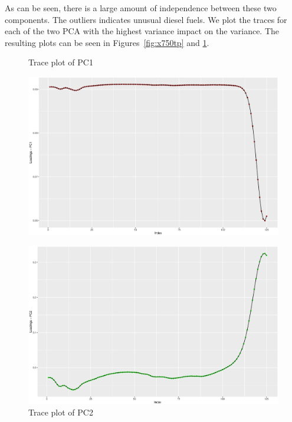 \documentclass[a4paper,12pt]{article}
\begin{document}
    As can be seen, there is a large amount of independence between these two components. The outliers indicates unusual diesel fuels. We plot the traces for each of the two PCA with the highest variance impact on the variance. The resulting plots can be seen in Figures~\ref{fig:x750tp} and \ref{fig:x752tp}.
    \begin{figure}[H]      
    \centering
    \begin{minipage}[]{0.49\textwidth}
    \caption{Trace plot of PC1}
    \label{fig:x750tp}
    \includegraphics[width=\textwidth]{figures/A2_trace_PC1.eps}     
    \end{minipage}
    \begin{minipage}[]{0.49\textwidth}
    \caption{Trace plot of PC2}
    \label{fig:x752tp}
    \includegraphics[width=\textwidth]{figures/A2_trace_PC2.eps}
    \end{minipage}
    \end{figure}
\end{document}

